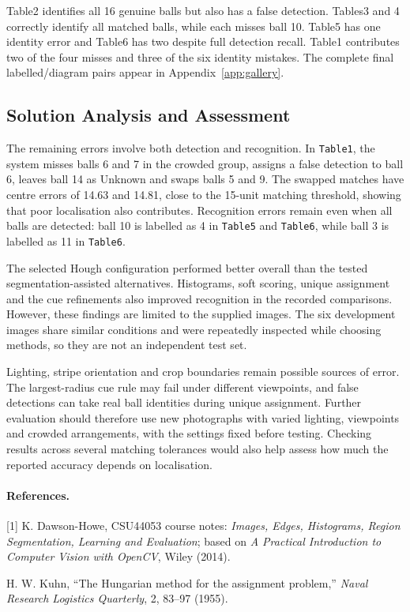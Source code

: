 \documentclass[12pt,a4paper]{article}
\begin{document}
Table2 identifies all 16 genuine balls but also has a false detection. Tables3 and 4 correctly identify all matched balls, while each misses ball 10. Table5 has one identity error and Table6 has two despite full detection recall. Table1 contributes two of the four misses and three of the six identity mistakes. The complete final labelled/diagram pairs appear in Appendix~\ref{app:gallery}.

\subsection{Solution Analysis and Assessment}
The remaining errors involve both detection and recognition. In
\texttt{Table1}, the system misses balls 6 and 7 in the crowded group,
assigns a false detection to ball 6, leaves ball 14 as Unknown and swaps
balls 5 and 9. The swapped matches have centre errors of 14.63 and 14.81,
close to the 15-unit matching threshold, showing that poor localisation
also contributes. Recognition errors remain even when all balls are
detected: ball 10 is labelled as 4 in \texttt{Table5} and \texttt{Table6},
while ball 3 is labelled as 11 in \texttt{Table6}.

The selected Hough configuration performed better overall than the tested
segmentation-assisted alternatives. Histograms, soft scoring, unique
assignment and the cue refinements also improved recognition in the
recorded comparisons. However, these findings are limited to the supplied
images. The six development images share similar conditions and were
repeatedly inspected while choosing methods, so they are not an independent
test set.

Lighting, stripe orientation and crop boundaries remain possible sources
of error. The largest-radius cue rule may fail under different viewpoints,
and false detections can take real ball identities during unique assignment.
Further evaluation should therefore use new photographs with varied
lighting, viewpoints and crowded arrangements, with the settings fixed
before testing. Checking results across several matching tolerances would
also help assess how much the reported accuracy depends on localisation.

\paragraph{References.}
[1] K. Dawson-Howe, CSU44053 course notes: \emph{Images, Edges, Histograms, Region Segmentation, Learning and Evaluation}; based on \emph{A Practical Introduction to Computer Vision with OpenCV}, Wiley (2014).\par
[2] H. W. Kuhn, ``The Hungarian method for the assignment problem,'' \emph{Naval Research Logistics Quarterly}, 2, 83--97 (1955).
\end{document}
